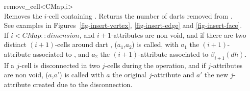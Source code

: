 \begin{ccRefFunction}{remove_cell<CMap,i>}
\\

{Removes the $i$-cell containing . 
  Returns the number of darts removed from .
 \\
  See examples in Figures~\ref{fig-insert-vertex}, \ref{fig-insert-edge} and \ref{fig-insert-face}.  \\
%
   If $i<CMap::dimension$, and $i+1$-attributes are
   non void, and if there are two distinct $(i+1)$-cells around dart
   , ($a_1$,$a_2$) is
   called, with $a_1$ the $(i+1)$-attribute associated to ,
   and $a_2$ the $(i+1)$-attribute associated to $\beta_{i+1}(dh)$.\\
   If a $j$-cell is disconnected in two $j$-cells during the
   operation, and if $j$-attributes are non void,
   ($a$,$a'$) is called 
   with $a$ the original $j$-attribute and $a'$ the new 
   $j$-attribute created due to the disconnection.
}



\end{ccRefFunction}
